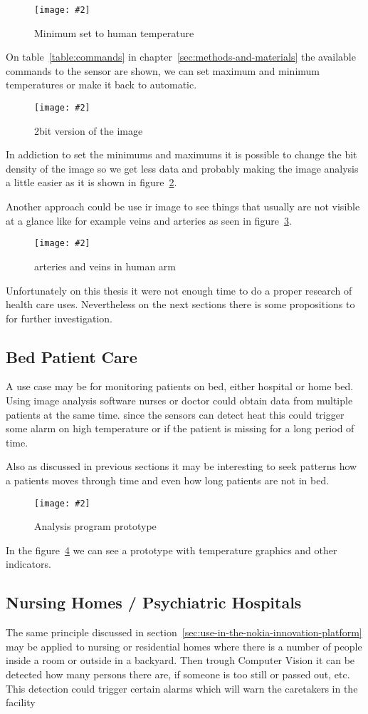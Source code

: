 \documentclass[hidelinks,11pt,a4paper,oneside,article]{memoir}
\newcommand{\putimage}[3][10] %
{
\begin{figure}[h]
	\centering
	\captionsetup{justification=centering}
	\texttt{[image: \#2]}
	\caption{#3}
	\label{fig:#2}
\end{figure}
}
\begin{document}
    \putimage{setminimum}{Minimum set to human temperature}

On table~\ref{table:commands} in chapter~\ref{sec:methods-and-materials} the available commands to the sensor are shown, we can set maximum and minimum temperatures or make it back to automatic.

    \putimage{2bit}{2bit version of the image}

In addiction to set the minimums and maximums it is possible to change the bit density of the image so we get less data and probably making the image analysis a little easier as it is shown in figure~\ref{fig:2bit}.

Another approach could be use \gls{ir} image to see things that usually are not visible at a glance like for example veins and arteries as seen in figure~\ref{fig:vein}.

	\putimage{vein}{arteries and veins in human arm}
	
Unfortunately on this thesis it were not enough time to do a proper research of health care uses. Nevertheless on the next sections there is some propositions to for further investigation.

\subsection{Bed Patient Care}
A use case may be for monitoring patients on bed, either hospital or home bed. Using image analysis software nurses or doctor could obtain data from multiple patients at the same time. since the sensors can detect heat this could trigger some alarm on high temperature or if the patient is missing for a long period of time.

Also as discussed in previous sections it may be interesting to seek patterns how a patients moves through time and even how long patients are not in bed.

    \putimage{fiber-detector-prototype}{Analysis program prototype}
    
In the figure~\ref{fig:fiber-detector-prototype} we can see a prototype with temperature graphics and other indicators.
    
\subsection{Nursing Homes / Psychiatric Hospitals}

The same principle discussed in section~\ref{sec:use-in-the-nokia-innovation-platform} may be applied to nursing or residential homes where there is a number of people inside a room or outside in a backyard. Then trough Computer Vision it can be detected how many persons there are, if someone is too still or passed out, etc. This detection could trigger certain alarms which will warn the caretakers in the facility
\end{document}
